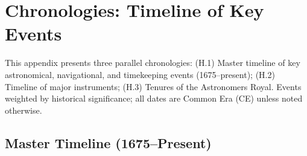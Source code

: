 \chapter{Chronologies: Timeline of Key Events}
\label{app:chronologies}

This appendix presents three parallel chronologies: (H.1) Master timeline of key astronomical, navigational, and timekeeping events (1675--present); (H.2) Timeline of major instruments; (H.3) Tenures of the Astronomers Royal. Events weighted by historical significance; all dates are Common Era (CE) unless noted otherwise.

\section{Master Timeline (1675--Present)}

